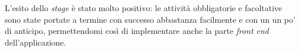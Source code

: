 L'esito dello \textit{stage} è stato molto positivo: le attività obbligatorie e facoltative sono state portate a termine con successo abbastanza facilmente 
e con un un po' di anticipo, permettendomi così di implementare anche la parte \textit{front end} dell'applicazione.

%
%

\endgroup			

\vfill

